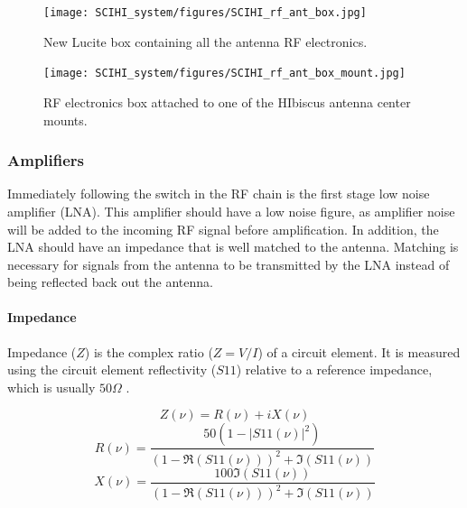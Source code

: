 \begin{figure}[htb]
\centering
\begin{minipage}[b]{0.47\textwidth}
\centering
\texttt{[image: SCIHI\_system/figures/SCIHI\_rf\_ant\_box.jpg]}
\caption{New Lucite box containing all the antenna RF electronics.}
\label{Fig:rf_ant_box}
\end{minipage}%
\begin{minipage}[b]{0.02\textwidth}
\hspace{1cm}
\end{minipage}%
\begin{minipage}[b]{0.47\textwidth}
\centering
\texttt{[image: SCIHI\_system/figures/SCIHI\_rf\_ant\_box\_mount.jpg]}
\caption{RF electronics box attached to one of the HIbiscus antenna center mounts.}
\label{Fig:rf_ant_mount}
\end{minipage}
\end{figure}

\subsubsection{Amplifiers} \label{Sec:Amp}

Immediately following the switch in the RF chain is the first stage low noise amplifier (LNA). This amplifier should have a low noise figure, as amplifier noise will be added to the incoming RF signal before amplification. In addition, the LNA should have an impedance that is well matched to the antenna. Matching is necessary for signals from the antenna to be transmitted by the LNA instead of being reflected back out the antenna. 

\paragraph{Impedance} 

Impedance ($Z$) is the complex ratio ($Z = V/I$) of a circuit element. It is measured using the circuit element reflectivity ($S11$) relative to a reference impedance, which is usually $50 \Omega$ \cite{stutzman1981}.

\begin{equation}\label{Eq:Imp_calc}
Z(\nu) = R(\nu)+ i X(\nu) 
\end{equation}
\begin{equation}
R(\nu) = \frac{50 (1-|S11(\nu)|^2)}{(1-\Re(S11(\nu)))^2 + \Im(S11(\nu))} 
\end{equation}
\begin{equation}
X(\nu) = \frac{100 \Im(S11(\nu))}{(1-\Re(S11(\nu)))^2 + \Im(S11(\nu))} 
\end{equation}

